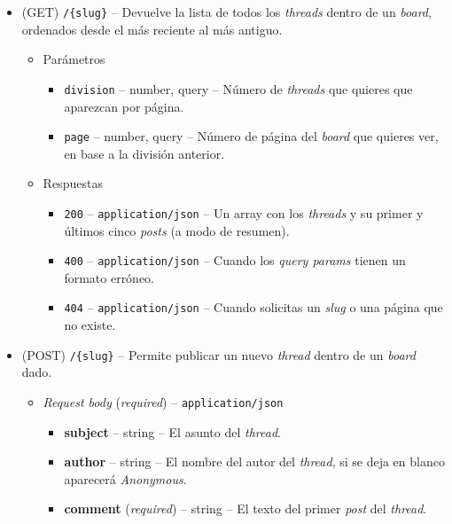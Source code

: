 \documentclass[12pt,a4paper,titlepage]{article}
\begin{document}
    \begin{itemize}
        \item (GET) \texttt{/\{slug\}} -- Devuelve la lista de todos los \textit{threads} dentro de un \textit{board}, ordenados desde el más reciente al más antiguo.
        \begin{itemize}
            \item Parámetros
            \begin{itemize}
                \item \texttt{division} -- number, query -- Número de \textit{threads} que quieres que aparezcan por página.
                \item \texttt{page} -- number, query -- Número de página del \textit{board} que quieres ver, en base a la división anterior.
            \end{itemize}
        \end{itemize}
        \begin{itemize}
            \item Respuestas
            \begin{itemize}
                \item \texttt{200} -- \texttt{application/json} -- Un array con los \textit{threads} y su primer y últimos cinco \textit{posts} (a modo de resumen).
                \item \texttt{400} -- \texttt{application/json} -- Cuando los \textit{query params} tienen un formato erróneo.
                \item \texttt{404} -- \texttt{application/json} -- Cuando solicitas un \textit{slug} o una página que no existe.
            \end{itemize}
        \end{itemize}
        \item (POST) \texttt{/\{slug\}} -- Permite publicar un nuevo \textit{thread} dentro de un \textit{board} dado.
        \begin{itemize}
            \item \textit{Request body} (\textit{required}) -- \texttt{application/json}
            \begin{itemize}
                \item \textbf{subject} -- string -- El asunto del \textit{thread}.
                \item \textbf{author} -- string -- El nombre del autor del \textit{thread}, si se deja en blanco aparecerá \textit{Anonymous}.
                \item \textbf{comment} (\textit{required}) -- string -- El texto del primer \textit{post} del \textit{thread}.

\end{itemize}
\end{itemize}
\end{itemize}
\end{document}
